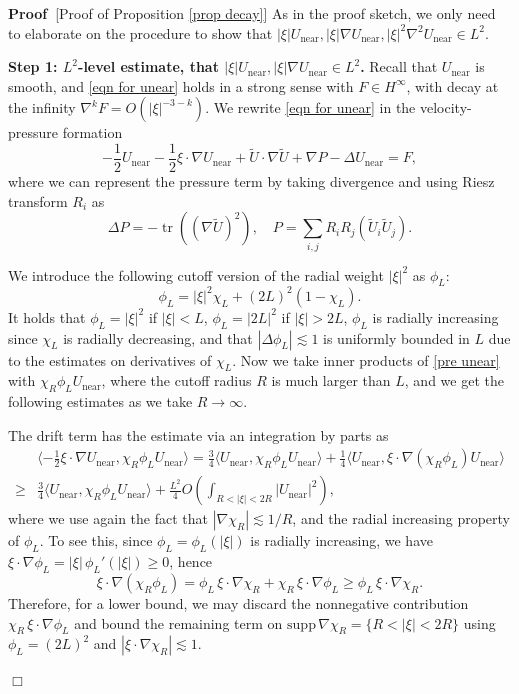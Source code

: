 \documentclass[11pt,a4paper]{article}
\numberwithin{equation}{section}
\newcommand{\cdummy}{\cdot}
\newcommand{\tmop}[1]{\ensuremath{\operatorname{#1}}}
\newenvironment{proof}{\noindent\textbf{Proof\ }}{\hspace*{\fill}$\Box$\medskip}
\begin{document}
\begin{proof}[Proof of Proposition \ref{prop decay}]
  As in the proof sketch, we only need to elaborate on the procedure to show that $|\xi|U_{\tmop{near}}, |\xi|\nabla U_{\tmop{near}}, |\xi|^2\nabla^2 U_{\tmop{near}}\in L^2$. %
  
 \smallskip
\noindent\textbf{Step 1: $L^2$-level estimate, that $|\xi|U_{\tmop{near}}, |\xi|\nabla U_{\tmop{near}}\in L^2$.} Recall that $U_{\tmop{near}}$ is smooth, and \eqref{eqn for unear} holds in a strong sense with $F\in H^\infty$, with decay at the infinity $\nabla^k F=O(|\xi|^{-3-k})$. We rewrite \eqref{eqn for unear} in the velocity-pressure formation \begin{equation}
- \frac{1}{2} U_{\tmop{near}} - \frac{1}{2} \xi \cdummy \nabla
       U_{\tmop{near}} + \widetilde{U} \cdot \nabla \widetilde{U}+\nabla P - \Delta
       U_{\tmop{near}} = F,
    \label{pre unear}
\end{equation}
where we can represent the pressure term by taking divergence and using Riesz transform $R_i$ as \begin{equation}
\Delta P = -\tmop{tr}((\nabla \widetilde{U})^2),\quad P=\sum_{i,j}R_iR_j(\widetilde{U}_i\widetilde{U}_j).
    \label{pressure unear}
\end{equation}

We introduce the following cutoff version of the radial weight $|\xi|^2$ as $\phi_{L}$:
\[\phi_{L}=|\xi|^2\chi_L+(2L)^2(1-\chi_L).\]
It holds that $\phi_{L}=|\xi|^2$ if $|\xi|<L$, $\phi_{L}=|2L|^2$ if $|\xi|>2L$, $\phi_{L}$ is radially increasing since $\chi_L$ is radially decreasing, and that $|\Delta\phi_{L}|\lesssim 1$ is uniformly bounded in $L$ due to the estimates on derivatives of $\chi_L$. Now we take inner products of \eqref{pre unear} with $\chi_R\phi_{L} U_{\tmop{near}}$, where the cutoff radius $R$ is much larger than $L$, and we get the following estimates as we take $R\to\infty$.

The drift term has the estimate via an integration by parts as \[\begin{aligned}
&\langle - \frac{1}{2} \xi \cdummy \nabla
       U_{\tmop{near}},\chi_R\phi_{L}U_{\tmop{near}}\rangle=\frac34\langle 
       U_{\tmop{near}},\chi_R\phi_{L}U_{\tmop{near}}\rangle+\frac{1}{4}\langle 
       U_{\tmop{near}},\xi\cdot\nabla(\chi_R\phi_{L})U_{\tmop{near}}\rangle \\\geqslant&  \frac34\langle 
       U_{\tmop{near}},\chi_R\phi_{L}U_{\tmop{near}}\rangle+\frac{L^2}{4}O(\int_{R<|\xi|<2R}|U_{\tmop{near}}|^2), 
\end{aligned}\]where we use again the fact that $|\nabla\chi_R|\lesssim1/R$, and the radial increasing property of $\phi_{L}$. To see this, 
since $\phi_L=\phi_L(|\xi|)$ is radially increasing, we have
$\xi\!\cdot\!\nabla\phi_L=|\xi|\,\phi_L'(|\xi|)\geqslant 0$, hence
\[
\xi\!\cdot\!\nabla(\chi_R\phi_L)=\phi_L\,\xi\!\cdot\!\nabla\chi_R
+\chi_R\,\xi\!\cdot\!\nabla\phi_L \geqslant  \phi_L\,\xi\!\cdot\!\nabla\chi_R.
\]
Therefore, for a lower bound, we may discard the nonnegative contribution
$\chi_R\,\xi\!\cdot\!\nabla\phi_L$ and bound the remaining term on
$\mathrm{supp}\,\nabla\chi_R=\{R<|\xi|<2R\}$ using
$\phi_L=(2L)^2$ and $|\xi\!\cdot\!\nabla\chi_R|\lesssim 1$.


\end{proof}
\end{document}
